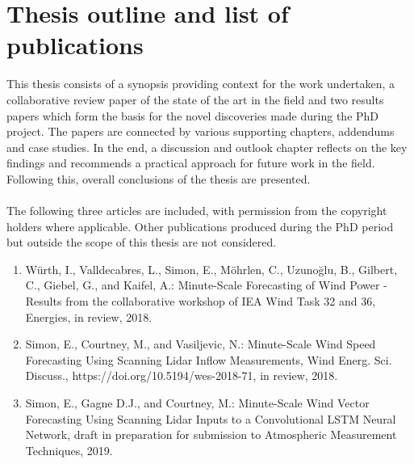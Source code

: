 \chapter{Thesis outline and list of publications}
\label{sec:outline}


This thesis consists of a synopsis providing context for the work undertaken, a collaborative review paper of the state of the art in the field and two results papers which form the basis for the novel discoveries made during the PhD project. The papers are connected by various supporting chapters, addendums and case studies. In the end, a discussion and outlook chapter reflects on the key findings and recommends a practical approach for future work in the field. Following this, overall conclusions of the thesis are presented.
\\\\
The following three articles are included, with permission from the copyright holders where applicable.
Other publications produced during the PhD period but outside the scope of this thesis are not considered.
\\
\begin{enumerate}
    \item W\"urth, I., Valldecabres, L., Simon, E., M\"ohrlen, C., Uzuno\u glu, B., Gilbert, C., Giebel, G., and Kaifel, A.: Minute-Scale Forecasting of Wind Power - Results from the collaborative workshop of IEA Wind Task 32 and 36, Energies, in review, 2018.
    
    \item Simon, E., Courtney, M., and Vasiljevic, N.: Minute-Scale Wind Speed Forecasting Using Scanning Lidar Inflow Measurements, Wind Energ. Sci. Discuss., https://doi.org/10.5194/wes-2018-71, in review, 2018.
    
    \item Simon, E., Gagne D.J., and Courtney, M.: Minute-Scale Wind Vector Forecasting Using Scanning Lidar Inputs to a Convolutional LSTM Neural Network, draft in preparation for submission to Atmospheric Measurement Techniques, 2019.

\end{enumerate}